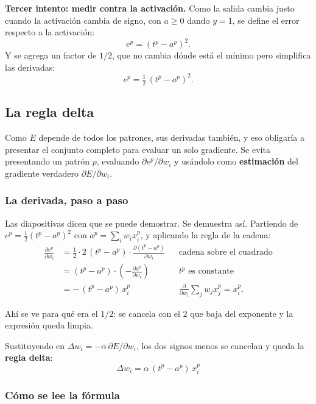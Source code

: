 \documentclass[11pt,letterpaper]{article}
\begin{document}
\textbf{Tercer intento: medir contra la activación.} Como la salida
cambia justo cuando la activación cambia de signo, con $a \geq 0$
dando $y = 1$, se define el error respecto a la activación:
\[
    e^p = (t^p - a^p)^2 .
\]
Y se agrega un factor de $1/2$, que no cambia dónde está el mínimo
pero simplifica las derivadas:
\[
    e^p = \tfrac{1}{2}\,(t^p - a^p)^2 .
\]


\subsection*{La regla delta}

Como $E$ depende de todos los patrones, sus derivadas también, y eso
obligaría a presentar el conjunto completo para evaluar un solo
gradiente. Se evita presentando un patrón $p$, evaluando
$\partial e^p / \partial w_i$ y usándolo como \textbf{estimación} del
gradiente verdadero $\partial E / \partial w_i$.

\subsubsection*{La derivada, paso a paso}

Las diapositivas dicen que se puede demostrar. Se demuestra así.
Partiendo de $e^p = \frac{1}{2}(t^p - a^p)^2$ con
$a^p = \sum_i w_i x_i^p$, y aplicando la regla de la cadena:
\begin{align*}
  \frac{\partial e^p}{\partial w_i}
    &= \frac{1}{2} \cdot 2\,(t^p - a^p) \cdot
       \frac{\partial (t^p - a^p)}{\partial w_i}
    && \text{cadena sobre el cuadrado} \\
    &= (t^p - a^p) \cdot
       \left( - \frac{\partial a^p}{\partial w_i} \right)
    && t^p \text{ es constante} \\
    &= -\,(t^p - a^p)\,x_i^p
    && \frac{\partial}{\partial w_i}\sum_j w_j x_j^p = x_i^p .
\end{align*}

Ahí se ve para qué era el $1/2$: se cancela con el $2$ que baja del
exponente y la expresión queda limpia.

Sustituyendo en $\Delta w_i = -\alpha\,\partial E/\partial w_i$, los
dos signos menos se cancelan y queda la \textbf{regla delta}:
\[
    \boxed{\;\Delta w_i = \alpha\,(t^p - a^p)\,x_i^p\;}
\]

\subsubsection*{Cómo se lee la fórmula}
\end{document}
